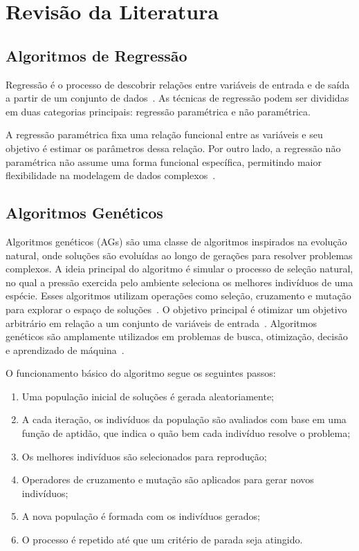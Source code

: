 \chapter{Revisão da Literatura}
\section{Algoritmos de Regressão}

Regressão é o processo de descobrir relações entre variáveis de entrada e de saída a partir de um conjunto de dados~\cite{STULP201560}. As técnicas de regressão podem ser divididas em duas categorias principais: regressão paramétrica e não paramétrica.

A regressão paramétrica fixa uma relação funcional entre as variáveis e seu objetivo é estimar os parâmetros dessa relação. Por outro lado, a regressão não paramétrica não assume uma forma funcional específica, permitindo maior flexibilidade na modelagem de dados complexos~\cite{Angelis2023}.

\section{Algoritmos Genéticos}

Algoritmos genéticos (AGs) são uma classe de algoritmos inspirados na evolução natural, onde soluções são evoluídas ao longo de gerações para resolver problemas complexos. A ideia principal do algoritmo é simular o processo de seleção natural, no qual a pressão exercida pelo ambiente seleciona os melhores indivíduos de uma espécie. Esses algoritmos utilizam operações como seleção, cruzamento e mutação para explorar o espaço de soluções~\cite{Angelis2023,sr_book}. O objetivo principal é otimizar um objetivo arbitrário em relação a um conjunto de variáveis de entrada~\cite{Beyer2002}. Algoritmos genéticos são amplamente utilizados em problemas de busca, otimização, decisão e aprendizado de máquina~\cite{galr}.

O funcionamento básico do algoritmo segue os seguintes passos:
\begin{enumerate}
  \item Uma população inicial de soluções é gerada aleatoriamente;
  \item A cada iteração, os indivíduos da população são avaliados com base em uma função de aptidão, que indica o quão bem cada indivíduo resolve o problema;
  \item Os melhores indivíduos são selecionados para reprodução;
  \item Operadores de cruzamento e mutação são aplicados para gerar novos indivíduos;
  \item A nova população é formada com os indivíduos gerados;
  \item O processo é repetido até que um critério de parada seja atingido.
\end{enumerate}

